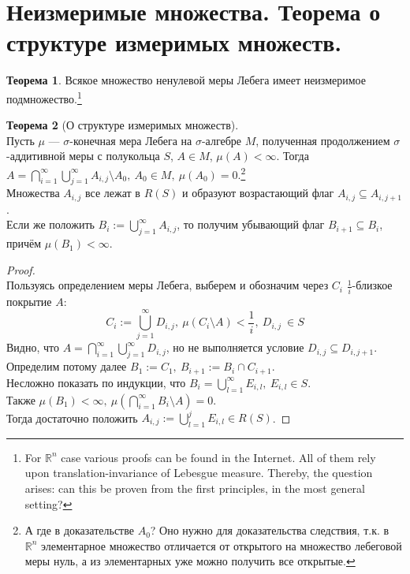 \documentclass[11pt,a4paper]{report}
\def\Real{\mathbb{R}}
\theoremstyle{definition}
\theoremstyle{definition}
\newtheorem{theorem}{Теорема}[section]
\theoremstyle{definition}
\begin{document}
	\section{Неизмеримые множества. Теорема о структуре измеримых множеств.}
	\begin{theorem}
		Всякое множество ненулевой меры Лебега имеет неизмеримое подмножество.\footnote{For $ \Real^{n} $ case various proofs can be found in the Internet. All of them rely upon translation-invariance of Lebesgue measure. Thereby, the question arises: can this be proven from the first principles, in the most general setting?}
	\end{theorem}
	\begin{theorem}[О структуре измеримых множеств]$  $\\
		Пусть $ \mu $ — $ \sigma $-конечная мера Лебега на $ \sigma $-алгебре $ M $, полученная продолжением $ \sigma $-аддитивной меры с полукольца $ S $, $ A \in M $, $ \mu(A) < \infty $. Тогда $ A = \bigcap\limits_{i=1}^{\infty}{\bigcup\limits_{j=1}^{\infty}{A_{i, j}} \setminus A_{0}},\ A_{0} \in M,\ \mu(A_{0}) = 0 $.\footnote{А где в доказательстве $ A_{0} $? Оно нужно для доказательства следствия, т.к. в $ \Real^{n} $ элементарное множество отличается от открытого на множество лебеговой меры нуль, а из элементарных уже можно получить все открытые.}\\
		Множества $ A_{i, j} $  все лежат в $ R(S) $ и образуют возрастающий флаг $ A_{i, j} \subseteq A_{i, j+1} $.\\
		Если же положить $ B_{i} := \bigcup\limits_{j=1}^{\infty}{A_{i, j}} $, то получим убывающий флаг $ B_{i+1} \subseteq B_{i}  $, причём $ \mu(B_{1}) < \infty $.
	\end{theorem}
	\begin{proof}$  $\\
		Пользуясь определением меры Лебега, выберем и обозначим через $ C_{i} $ $ \frac{1}{i} $-близкое покрытие $ A $: 
		\[ C_{i} := \bigcup\limits_{j=1}^{\infty}{D_{i, j}},\ \mu(C_{i} \setminus A) < \frac{1}{i},\ D_{i, j}\ \in S \]
		Видно, что $ A = \bigcap\limits_{i=1}^{\infty}{\bigcup\limits_{j=1}^{\infty}{D_{i, j}}} $, но не выполняется условие $ D_{i, j} \subseteq D_{i, j+1} $.\\
		Определим потому далее $ B_{1} := C_{1},\ B_{i+1} := B_{i} \cap C_{i+1} $.\\ 
		Несложно показать по индукции, что $ B_{i} = \bigcup\limits_{l=1}^{\infty}{E_{i, l}},\ E_{i, l} \in S $.\\
		Также $ \mu(B_{1}) < \infty,\ \mu\left (\bigcap\limits_{i=1}^{\infty}{B_{i} \setminus A}\right ) = 0 $.\\
		Тогда достаточно положить $ A_{i, j} := \bigcup\limits_{l=1}^{j}{E_{i, l}} \in R(S) $.
	\end{proof}
\end{document}
